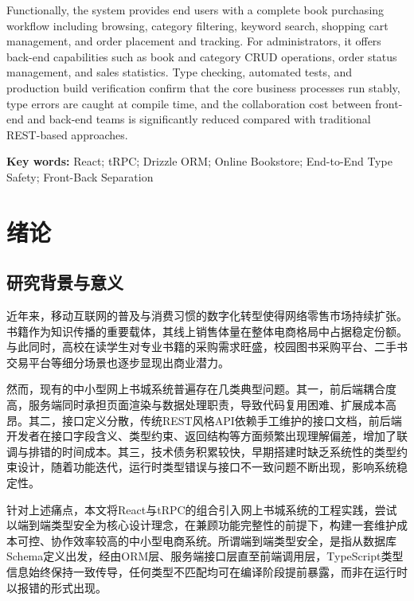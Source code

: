 \documentclass[12pt,a4paper]{ctexart}
\begin{document}
Functionally, the system provides end users with a complete book purchasing workflow including browsing, category filtering, keyword search, shopping cart management, and order placement and tracking. For administrators, it offers back-end capabilities such as book and category CRUD operations, order status management, and sales statistics. Type checking, automated tests, and production build verification confirm that the core business processes run stably, type errors are caught at compile time, and the collaboration cost between front-end and back-end teams is significantly reduced compared with traditional REST-based approaches.

\vspace{0.5cm}
\noindent\textbf{Key words:} React; tRPC; Drizzle ORM; Online Bookstore; End-to-End Type Safety; Front-Back Separation
\newpage

\tableofcontents
\newpage
{}
\setcounter{page}{1}

\section{绪论}

\subsection{研究背景与意义}

近年来，移动互联网的普及与消费习惯的数字化转型使得网络零售市场持续扩张。书籍作为知识传播的重要载体，其线上销售体量在整体电商格局中占据稳定份额。与此同时，高校在读学生对专业书籍的采购需求旺盛，校园图书采购平台、二手书交易平台等细分场景也逐步显现出商业潜力。

然而，现有的中小型网上书城系统普遍存在几类典型问题。其一，前后端耦合度高，服务端同时承担页面渲染与数据处理职责，导致代码复用困难、扩展成本高昂。其二，接口定义分散，传统REST风格API依赖手工维护的接口文档，前后端开发者在接口字段含义、类型约束、返回结构等方面频繁出现理解偏差，增加了联调与排错的时间成本。其三，技术债务积累较快，早期搭建时缺乏系统性的类型约束设计，随着功能迭代，运行时类型错误与接口不一致问题不断出现，影响系统稳定性。

针对上述痛点，本文将React与tRPC的组合引入网上书城系统的工程实践，尝试以端到端类型安全为核心设计理念，在兼顾功能完整性的前提下，构建一套维护成本可控、协作效率较高的中小型电商系统。所谓端到端类型安全，是指从数据库Schema定义出发，经由ORM层、服务端接口层直至前端调用层，TypeScript类型信息始终保持一致传导，任何类型不匹配均可在编译阶段提前暴露，而非在运行时以报错的形式出现。
\end{document}
